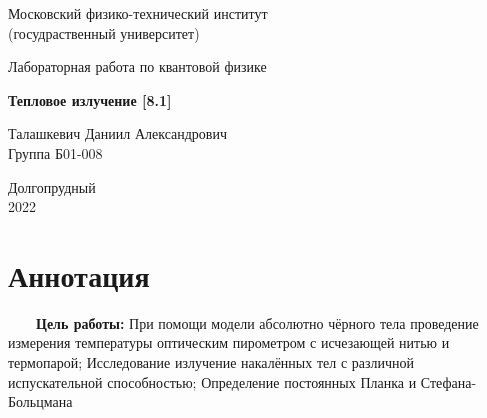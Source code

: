 \documentclass[a4paper, 12pt]{article}%
\begin{document}


\begin{titlepage}

	\newpage
	\begin{center}
		\normalsize Московский физико-технический институт \\(госудраственный 			университет)
	\end{center}

	\vspace{6em}

	\begin{center}
		\Large Лабораторная работа по квантовой физике\\
	\end{center}

	\vspace{1em}

	\begin{center}
		\large \textbf{Тепловое излучение [8.1]}
	\end{center}

	\vspace{2em}

	\begin{center}
		\large Талашкевич Даниил Александрович\\
		Группа Б01-008
	\end{center}

	\vspace{\fill}

	\begin{center}
	Долгопрудный \\2022
	\end{center}
	
\end{titlepage}



	\thispagestyle{empty}
	\newpage
	\tableofcontents
	\newpage
	\setcounter{page}{1}




\section{Аннотация}

\ \ \ \ \textbf{Цель работы:} При помощи модели абсолютно чёрного тела проведение измерения температуры оптическим пирометром с исчезающей нитью и термопарой; Исследование излучение накалённых тел с различной испускательной способностью; Определение постоянных Планка и Стефана-Больцмана
\end{document}
